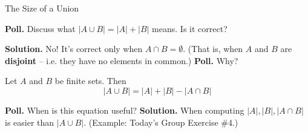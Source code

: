 \documentclass[10pt]{beamer}
\begin{document}
\begin{frame}{The Size of a Union}
\small 

\colorbox{yellow!30}{\textbf{Poll.}} Discuss what $|A \cup B | = |A| + |B|$ means. Is it correct?

\vfill 
\pause 
\colorbox{green!30}{\textbf{Solution.}} No! It's correct only when $A \cap B = \emptyset$. (That is, when $A$ and $B$ are \textbf{disjoint} -- i.e. they have no elements in common.)  \pause \colorbox{yellow!30}{\textbf{Poll.}} Why? \pause 



\begin{mygreenbox}[title=\text{The Size of a Union (Scheinerman Prop 12.4)}]
Let $A$ and $B$ be finite sets. Then
\[ |A \cup B | = |A| + |B| - |A \cap B|\] 
\end{mygreenbox}


\vfill

\begin{center}
\end{center}

\vfill 
\pause 

\colorbox{yellow!30}{\textbf{Poll.}} When is this equation useful?  \pause  \colorbox{green!30}{\textbf{Solution.}} When  computing $|A|,|B|, |A \cap B|$ is easier than $|A \cup B|$. \pause (Example: Today's Group Exercise \#4.)
\end{frame}
\end{document}
